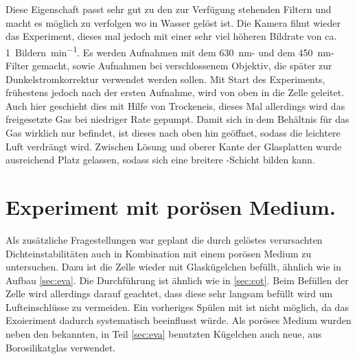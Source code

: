 Diese Eigenschaft passt sehr gut zu den zur Verfügung stehenden Filtern und macht es möglich zu verfolgen wo \COT in Wasser gelöst ist.
Die Kamera filmt wieder das Experiment, dieses mal jedoch mit einer sehr viel höheren Bildrate von ca. \SI{1}{Bildern\per\minute}.  Es werden Aufnahmen mit dem \SI{630}{\nano\meter}- und dem \SI{450}{\nano\meter}-Filter gemacht, sowie Aufnahmen bei verschlossenem Objektiv, die später zur Dunkelstromkorrektur verwendet werden sollen. 
Mit Start des Experiments, frühestens jedoch nach der ersten Aufnahme, wird von oben \COT in die Zelle geleitet. Auch hier geschieht dies mit Hilfe von Trockeneis, dieses Mal allerdings wird das freigesetzte Gas bei niedriger Rate gepumpt. Damit sich in dem Behältnis für das Gas wirklich nur \COT befindet, ist dieses nach oben hin geöffnet, sodass die leichtere Luft verdrängt wird. Zwischen Lösung und oberer Kante der Glasplatten wurde ausreichend Platz gelassen, sodass sich eine breitere \COT-Schicht bilden kann.

\section{\COT Experiment mit porösen Medium.}
\label{sec:cpm}
Als zusätzliche Fragestellungen war geplant die durch gelöstes \COT verursachten Dichteinstabilitäten auch in Kombination mit einem porösen Medium zu untersuchen. Dazu ist die Zelle wieder mit Glaskügelchen befüllt, ähnlich wie in Aufbau \ref{sec:eva}.
Die Durchführung ist ähnlich wie in \ref{sec:cot}. Beim Befüllen der Zelle wird allerdings darauf geachtet, dass diese sehr langsam befüllt wird um Lufteinschlüsse zu vermeiden. Ein vorheriges Spülen mit \COT ist nicht möglich, da das Exoieriment dadurch systematisch beeinflusst würde.
Als poröses Medium wurden neben den bekannten, in Teil \ref{sec:eva} benutzten Kügelchen auch neue, aus Borosilikatglas verwendet.

